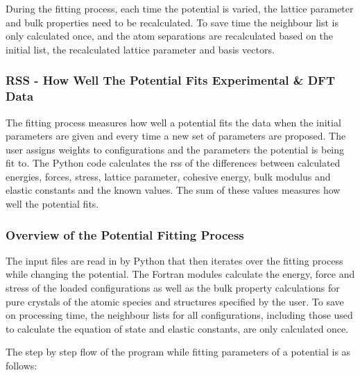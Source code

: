 During the fitting process, each time the potential is varied, the lattice parameter and bulk properties need to be recalculated.  To save time the neighbour list is only calculated once, and the atom separations are recalculated based on the initial list, the recalculated lattice parameter and basis vectors.


\subsubsection{RSS - How Well The Potential Fits Experimental \& DFT Data}

The fitting process measures how well a potential fits the data when the initial parameters are given and every time a new set of parameters are proposed.  The user assigns weights to configurations and the parameters the potential is being fit to.  The Python code calculates the \acrfull{rss} of the differences between calculated energies, forces, stress, lattice parameter, cohesive energy, bulk modulus and elastic constants and the known values.  The sum of these values measures how well the potential fits.



\subsubsection{Overview of the Potential Fitting Process}

The input files are read in by Python that then iterates over the fitting process while changing the potential.  The Fortran modules calculate the energy, force and stress of the loaded configurations as well as the bulk property calculations for pure crystals of the atomic species and structures specified by the user.  To save on processing time, the neighbour lists for all configurations, including those used to calculate the equation of state and elastic constants, are only calculated once. 

The step by step flow of the program while fitting parameters of a potential is as follows:

